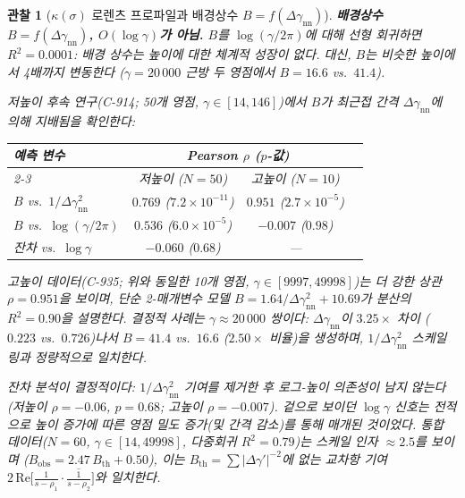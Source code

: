 \documentclass[11pt, a4paper]{article}
\theoremstyle{definition}
\theoremstyle{plain}
\newtheorem{observation}[theorem]{관찰}
\begin{document}
\begin{observation}[$\kappa(\sigma)$ 로렌츠 프로파일과 배경상수
  $B = f(\Delta\gamma_{\mathrm{nn}})$]
\smallskip\noindent
\textbf{배경상수 $B = f(\Delta\gamma_{\mathrm{nn}})$, $O(\log\gamma)$가 아님.}\;
$B$를 $\log(\gamma/2\pi)$에 대해 선형 회귀하면 $R^2 = 0.0001$:
배경 상수는 높이에 대한 \emph{체계적 성장이 없다}.
대신, $B$는 비슷한 높이에서 4배까지 변동한다
($\gamma = 20\,000$ 근방 두 영점에서 $B = 16.6$ vs.\ $41.4$).

저높이 후속 연구(C-914; 50개 영점, $\gamma\in[14,146]$)에서
$B$가 \emph{최근접 간격} $\Delta\gamma_{\mathrm{nn}}$에 의해
지배됨을 확인한다:
\begin{center}\small
\begin{tabular}{@{}lccc@{}}
\toprule
예측 변수 & \multicolumn{2}{c}{Pearson $\rho$ ($p$-값)} \\
\cmidrule(lr){2-3}
 & 저높이 ($N{=}50$) & 고높이 ($N{=}10$) \\
\midrule
$B$ vs.\ $1/\Delta\gamma_{\mathrm{nn}}^2$
  & $0.769$ ($7.2{\times}10^{-11}$) & $0.951$ ($2.7{\times}10^{-5}$) \\
$B$ vs.\ $\log(\gamma/2\pi)$
  & $0.536$ ($6.0{\times}10^{-5}$) & $-0.007$ ($0.98$) \\
잔차 vs.\ $\log\gamma$
  & $-0.060$ ($0.68$) & --- \\
\bottomrule
\end{tabular}
\end{center}
고높이 데이터(C-935; 위와 동일한 10개 영점,
$\gamma\in[9997,49998]$)는 더 강한 상관
$\rho = 0.951$을 보이며, 단순 2-매개변수 모델
$B = 1.64/\Delta\gamma_{\mathrm{nn}}^2 + 10.69$가
분산의 $R^2 = 0.90$을 설명한다.
결정적 사례는 $\gamma\approx 20\,000$ 쌍이다:
$\Delta\gamma_{\mathrm{nn}}$이 $3.25\times$ 차이
($0.223$ vs.\ $0.726$)나서 $B = 41.4$ vs.\ $16.6$
($2.50\times$ 비율)을 생성하며,
$1/\Delta\gamma_{\mathrm{nn}}^2$ 스케일링과 정량적으로 일치한다.

잔차 분석이 결정적이다: $1/\Delta\gamma_{\mathrm{nn}}^2$ 기여를 제거한 후
\emph{로그-높이 의존성이 남지 않는다}
(저높이 $\rho = -0.06$, $p = 0.68$; 고높이 $\rho = -0.007$).
겉으로 보이던 $\log\gamma$ 신호는 전적으로 높이 증가에 따른
영점 밀도 증가(및 간격 감소)를 통해 매개된 것이었다.
통합 데이터($N = 60$, $\gamma\in[14,49998]$,
다중회귀 $R^2 = 0.79$)는 스케일 인자 ${\approx}2.5$를 보이며
($B_{\mathrm{obs}} = 2.47\,B_{\mathrm{th}} + 0.50$),
이는 $B_{\mathrm{th}} = \sum |\Delta\gamma'|^{-2}$에 없는 교차항 기여
$2\,\mathrm{Re}\!\bigl[\tfrac{1}{s{-}\rho_1}\cdot
\overline{\tfrac{1}{s{-}\rho_2}}\bigr]$와 일치한다.


\end{observation}
\end{document}
